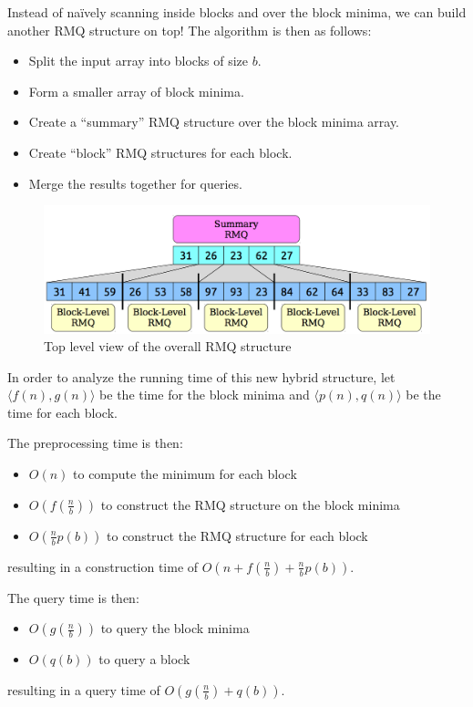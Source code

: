 \documentclass[11pt, oneside]{article}
\begin{document}
Instead of naïvely scanning inside blocks and over the block minima, we can build another RMQ
structure on top! The algorithm is then as follows:
\begin{itemize}
  \item Split the input array into blocks of size \( b \).
  \item Form a smaller array of block minima.
  \item Create a ``summary'' RMQ structure over the block minima array.
  \item Create ``block'' RMQ structures for each block.
  \item Merge the results together for queries.
\end{itemize}

\begin{figure}[h!]
\centering
\includegraphics[scale=0.25]{summary}
\caption{Top level view of the overall RMQ structure}
\end{figure}

In order to analyze the running time of this new hybrid structure, let
\( \langle f(n), g(n) \rangle \) be the time for the block minima and
\( \langle p(n), q(n) \rangle \) be the time for each block.

The preprocessing time is then:
\begin{itemize}
  \item \( O(n) \) to compute the minimum for each block
  \item \( O(f(\frac{n}{b})) \) to construct the RMQ structure on the block minima
  \item \( O(\frac{n}{b} p(b)) \) to construct the RMQ structure for each block
\end{itemize}
resulting in a construction time of \( O(n + f(\frac{n}{b}) + \frac{n}{b} p(b)) \).

The query time is then:
\begin{itemize}
  \item \( O(g(\frac{n}{b})) \) to query the block minima
  \item \( O(q(b)) \) to query a block
\end{itemize}
resulting in a query time of \( O(g(\frac{n}{b}) + q(b)) \).
\end{document}
